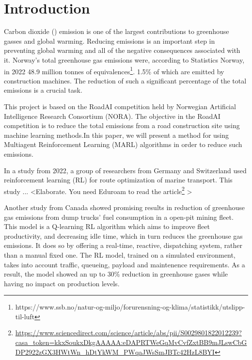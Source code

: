 \documentclass[conference]{IEEEtran}
\begin{document}
\section{Introduction}
Carbon dioxide (\coo{}) emission is one of the largest contributions to greenhouse gasses and global warming.
Reducing \coo{} emissions is an important step in preventing global warming and all of the negative
consequences associated with it. Norway's total greenhouse gas emissions were, according to Statistics
Norway, in 2022 48.9 million tonnes of \coo{}
equivalences\footnote{https://www.ssb.no/natur-og-miljo/forurensning-og-klima/statistikk/utslipp-til-luft}.
1.5\% of which are emitted by construction machines. \cite{noraRoadAIReducing} The reduction of such
a significant percentage of the total emissions is a crucial task.

  This project is based on the RoadAI competition held by Norwegian Artificial Intelligence Research
  Consortium (NORA). \cite{noraRoadAIReducing} The objective in the RoadAI competition is to reduce the
  total \coo{} emissions from a road construction site using machine learning methods.In this paper, we will
  present a method for using Multiagent Reinforcement Learning (MARL) algorithms in order to reduce such
  emissions.


  In a study from 2022, a group of researchers from Germany and Switzerland used reinforcement learning
  (RL) for route optimization of marine transport. \cite{MORADI2022111882} This study ... \textless Elaborate. You need
  Eduroam to read the article\footnote{\url{https://www.sciencedirect.com/science/article/abs/pii/S0029801822012239?casa_token=kkxSoukxDkgAAAAA:eDAPRTWeGqMvCvfZxtBB9mJLswCbGDP2922zGX3HWtWn_hDtYkWM_PWqaJWsSmJBTc42HzL8BYI}} \textgreater

  Another study from Canada \cite{HUO2023106664} showed promising results in reduction of greenhouse gas
  emissions
  from dump trucks' fuel consumption in a open-pit mining fleet. This model is a Q-learning RL algorithm
  which aims to improve fleet productivity, and decreasing idle time, which in turn reduces the greenhouse
  gas emissions. It does so by offering a real-time, reactive,  dispatching system, rather than a manual
  fixed one. The RL model, trained on a simulated environment, takes into account traffic, queueing,
  payload and maintenence requirements. As a result, the model showed an up to 30\% reduction in greenhouse
  gases while having no impact on production levels.
\end{document}
